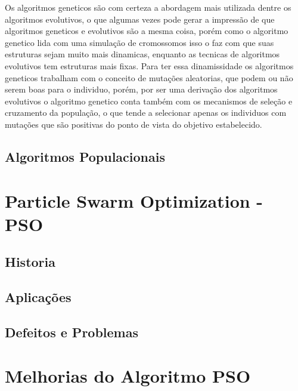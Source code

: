         Os algoritmos geneticos são com certeza a abordagem mais utilizada dentre os algoritmos evolutivos, o que algumas vezes pode gerar a impressão de que algoritmos geneticos e evolutivos são a mesma coisa, porém como o algoritmo genetico lida com uma simulação de cromossomos isso o faz com que suas estruturas sejam muito mais dinamicas, enquanto as tecnicas de algoritmos evolutivos tem estruturas mais fixas.\newline
        Para ter essa dinamissidade os algoritmos geneticos trabalham com o conceito de mutações aleatorias, que podem ou não serem boas para o individuo, porém, por ser uma derivação dos algoritmos evolutivos o algoritmo genetico conta também com os mecanismos de seleção e cruzamento da população, o que tende a selecionar apenas os individuos com mutações que são positivas do ponto de vista do objetivo estabelecido.


    \subsection{Algoritmos Populacionais}





\section{Particle Swarm Optimization - PSO}
\lipsum[4]

\subsection{Historia}
\lipsum[2]

\subsection{Aplicações}
\lipsum[3]

\subsection{Defeitos e Problemas}
\lipsum[2]

\section{Melhorias do Algoritmo PSO}
\lipsum[2]

